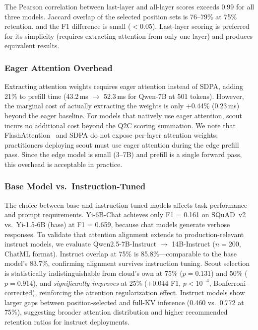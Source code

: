 \documentclass[journal]{IEEEtran}
\begin{document}
The Pearson correlation between last-layer and all-layer scores exceeds 0.99 for all three models.
Jaccard overlap of the selected position sets is 76--79\% at 75\% retention, and the F1 difference is small ($<$0.05).
Last-layer scoring is preferred for its simplicity (requires extracting attention from only one layer) and produces equivalent results.

\subsubsection{Eager Attention Overhead}

Extracting attention weights requires eager attention instead of SDPA, adding 21\% to prefill time (43.2\,ms $\to$ 52.3\,ms for Qwen-7B at 501 tokens).
However, the marginal cost of actually extracting the weights is only +0.44\% (0.23\,ms) beyond the eager baseline.
For models that natively use eager attention, scout incurs no additional cost beyond the Q2C scoring summation.
We note that FlashAttention~\cite{flashattn} and SDPA do not expose per-layer attention weights; practitioners deploying scout must use eager attention during the edge prefill pass.
Since the edge model is small (3--7B) and prefill is a single forward pass, this overhead is acceptable in practice.

\subsubsection{Base Model vs.\ Instruction-Tuned}

The choice between base and instruction-tuned models affects task performance and prompt requirements.
Yi-6B-Chat achieves only F1 = 0.161 on SQuAD~v2 vs.\ Yi-1.5-6B (base) at F1 = 0.659, because chat models generate verbose responses.
To validate that attention alignment extends to production-relevant instruct models, we evaluate Qwen2.5-7B-Instruct $\to$ 14B-Instruct ($n = 200$, ChatML format).
Instruct overlap at 75\% is 85.8\%---comparable to the base model's 83.7\%, confirming alignment survives instruction tuning.
Scout selection is statistically indistinguishable from cloud's own at 75\% ($p = 0.131$) and 50\% ($p = 0.914$), and \emph{significantly improves} at 25\% ($+0.044$ F1, $p < 10^{-4}$, Bonferroni-corrected), reinforcing the attention regularization effect.
Instruct models show larger gaps between position-selected and full-KV inference (0.460 vs.\ 0.772 at 75\%), suggesting broader attention distribution and higher recommended retention ratios for instruct deployments.
\end{document}
